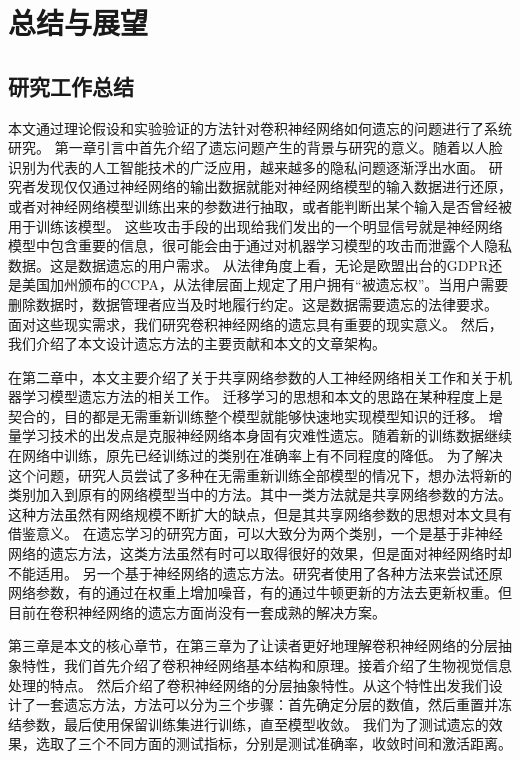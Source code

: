 
\chapter{总结与展望}

\section{研究工作总结}

本文通过理论假设和实验验证的方法针对卷积神经网络如何遗忘的问题进行了系统研究。
第一章引言中首先介绍了遗忘问题产生的背景与研究的意义。随着以人脸识别为代表的人工智能技术的广泛应用，越来越多的隐私问题逐渐浮出水面。
研究者发现仅仅通过神经网络的输出数据就能对神经网络模型的输入数据进行还原，或者对神经网络模型训练出来的参数进行抽取，或者能判断出某个输入是否曾经被用于训练该模型。
这些攻击手段的出现给我们发出的一个明显信号就是神经网络模型中包含重要的信息，很可能会由于通过对机器学习模型的攻击而泄露个人隐私数据。这是数据遗忘的用户需求。
从法律角度上看，无论是欧盟出台的GDPR还是美国加州颁布的CCPA，从法律层面上规定了用户拥有“被遗忘权”。当用户需要删除数据时，数据管理者应当及时地履行约定。这是数据需要遗忘的法律要求。
面对这些现实需求，我们研究卷积神经网络的遗忘具有重要的现实意义。
然后，我们介绍了本文设计遗忘方法的主要贡献和本文的文章架构。

在第二章中，本文主要介绍了关于共享网络参数的人工神经网络相关工作和关于机器学习模型遗忘方法的相关工作。
迁移学习的思想和本文的思路在某种程度上是契合的，目的都是无需重新训练整个模型就能够快速地实现模型知识的迁移。
增量学习技术的出发点是克服神经网络本身固有灾难性遗忘。随着新的训练数据继续在网络中训练，原先已经训练过的类别在准确率上有不同程度的降低。
为了解决这个问题，研究人员尝试了多种在无需重新训练全部模型的情况下，想办法将新的类别加入到原有的网络模型当中的方法。其中一类方法就是共享网络参数的方法。
这种方法虽然有网络规模不断扩大的缺点，但是其共享网络参数的思想对本文具有借鉴意义。
在遗忘学习的研究方面，可以大致分为两个类别，一个是基于非神经网络的遗忘方法，这类方法虽然有时可以取得很好的效果，但是面对神经网络时却不能适用。
另一个基于神经网络的遗忘方法。研究者使用了各种方法来尝试还原网络参数，有的通过在权重上增加噪音，有的通过牛顿更新的方法去更新权重。但目前在卷积神经网络的遗忘方面尚没有一套成熟的解决方案。

第三章是本文的核心章节，在第三章为了让读者更好地理解卷积神经网络的分层抽象特性，我们首先介绍了卷积神经网络基本结构和原理。接着介绍了生物视觉信息处理的特点。
然后介绍了卷积神经网络的分层抽象特性。从这个特性出发我们设计了一套遗忘方法，方法可以分为三个步骤：首先确定分层的数值，然后重置并冻结参数，最后使用保留训练集进行训练，直至模型收敛。
我们为了测试遗忘的效果，选取了三个不同方面的测试指标，分别是测试准确率，收敛时间和激活距离。

